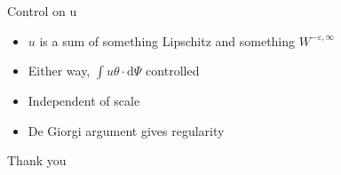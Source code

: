 \documentclass{beamer}
\newcommand{\Z}{\mathbb{Z}}
\newcommand{\eps}{\varepsilon}
\newcommand{\norm}[1]{\left\lVert#1\right\rVert}
\newcommand{\grad}{\nabla}
\newcommand{\n}{^{-1}}
\begin{document}



\begin{frame}{Control on u}

\begin{itemize}
\item $u$ is a sum of something Lipschitz and something $W^{-\eps,\infty}$
\item Either way, $\int u \theta \cdot \textrm{d}\Psi$ controlled
\item Independent of scale
\item De Giorgi argument gives regularity
\end{itemize}

\end{frame}



\begin{frame}
\centering \Large
Thank you

\end{frame}
\end{document}
